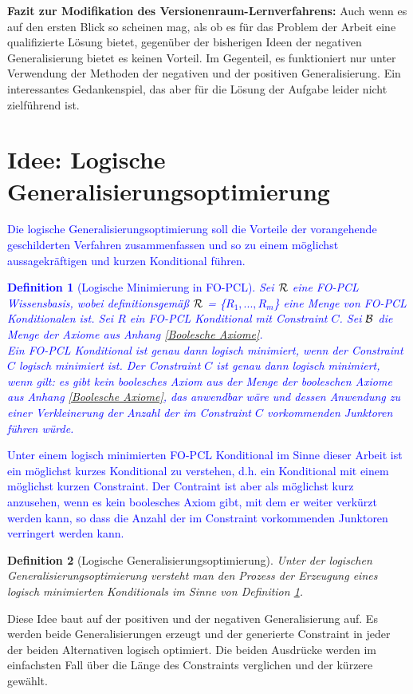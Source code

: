 \documentclass[a4paper, 11pt]{book}
\newtheorem{Def}{Definition }[section]
\begin{document}
\textbf{{\large Fazit zur Modifikation des Versionenraum-Lernverfahrens:}} \label{Fazit VRL} 
Auch wenn es auf den ersten Blick so scheinen mag, als ob es für das Problem der Arbeit eine qualifizierte Lösung bietet, gegenüber der bisherigen Ideen der negativen Generalisierung bietet es keinen Vorteil. Im Gegenteil, es funktioniert nur unter Verwendung der Methoden der negativen und der positiven Generalisierung. Ein interessantes Gedankenspiel, das aber für die Lösung der Aufgabe leider nicht zielführend ist. 



\section{Idee: Logische Generalisierungsoptimierung} 

\textcolor{blue}{
	Die logische Generalisierungsoptimierung soll die Vorteile der vorangehende geschilderten Verfahren zusammenfassen und so zu einem möglichst aussagekräftigen und kurzen Konditional führen.
\begin{Def}[Logische Minimierung in FO-PCL] \label{Logische Min} 
	Sei $\cal{R}$ eine FO-PCL Wissensbasis, wobei definitionsgemäß $\cal{R}$  = \{$ R_1, ..., R_m $\} eine Menge von FO-PCL Konditionalen ist. Sei $ R $ ein FO-PCL Konditional mit Constraint $ C $. Sei $ \cal B $ die Menge der Axiome aus Anhang \ref{Boolesche Axiome}.\\
	Ein FO-PCL Konditional ist genau dann logisch minimiert, wenn der Constraint $ C $ logisch minimiert ist. Der Constraint $ C $ ist genau dann logisch minimiert, wenn gilt: es gibt kein boolesches Axiom aus der Menge der booleschen Axiome aus Anhang \ref{Boolesche Axiome}, das anwendbar wäre und dessen Anwendung zu einer Verkleinerung der Anzahl der im Constraint $ C $ vorkommenden Junktoren führen würde.
\end{Def}
Unter einem logisch minimierten FO-PCL Konditional im Sinne dieser Arbeit ist ein möglichst kurzes Konditional zu verstehen, d.h. ein Konditional mit einem möglichst kurzen Constraint. Der Contraint ist aber als möglichst kurz anzusehen, wenn es kein boolesches Axiom gibt, mit dem er weiter verkürzt werden kann, so dass die Anzahl der im Constraint vorkommenden Junktoren verringert werden kann. 
}


\begin{Def}[Logische Generalisierungsoptimierung]\label{Logische Genopt}
	Unter der logischen Generalisierungsoptimierung versteht man den Prozess der Erzeugung eines logisch minimierten Konditionals im Sinne von Definition \ref{Logische Min}.
\end{Def}
Diese Idee baut auf der positiven und der negativen Generalisierung auf. Es werden beide Generalisierungen erzeugt und der generierte Constraint in jeder der beiden Alternativen logisch optimiert. Die beiden Ausdrücke werden im einfachsten Fall über die Länge des Constraints verglichen und der kürzere gewählt.\\
\end{document}
